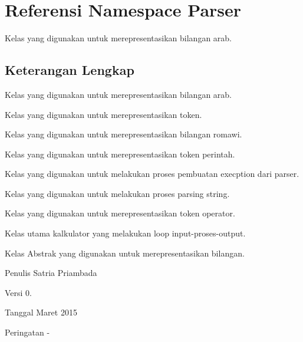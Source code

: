 \hypertarget{namespaceParser}{}\section{Referensi Namespace Parser}
\label{namespaceParser}


Kelas yang digunakan untuk merepresentasikan bilangan arab.  




\subsection{Keterangan Lengkap}
Kelas yang digunakan untuk merepresentasikan bilangan arab. 

Kelas yang digunakan untuk merepresentasikan token.

Kelas yang digunakan untuk merepresentasikan bilangan romawi.

Kelas yang digunakan untuk merepresentasikan token perintah.

Kelas yang digunakan untuk melakukan proses pembuatan execption dari parser.

Kelas yang digunakan untuk melakukan proses parsing string.

Kelas yang digunakan untuk merepresentasikan token operator.

Kelas utama kalkulator yang melakukan loop input-\/proses-\/output.

Kelas Abstrak yang digunakan untuk merepresentasikan bilangan.

\begin{DoxyAuthor}{Penulis}
Satria Priambada 
\end{DoxyAuthor}
\begin{DoxyVersion}{Versi}
0. 
\end{DoxyVersion}
\begin{DoxyDate}{Tanggal}
Maret 2015 
\end{DoxyDate}
\begin{DoxyWarning}{Peringatan}
-\/ 
\end{DoxyWarning}
